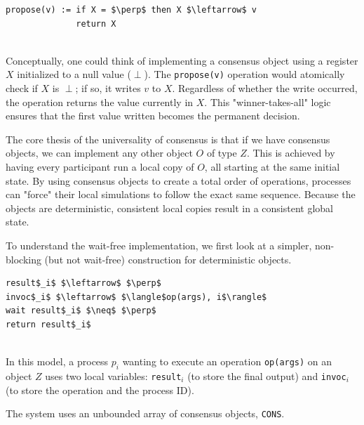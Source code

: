 \begin{minipage}{\textwidth}
\begin{lstlisting}[mathescape]
propose(v) := if X = $\perp$ then X $\leftarrow$ v
              return X
\end{lstlisting}
\end{minipage}\\
    
Conceptually, one could think of implementing a consensus object using a register $X$ initialized to a null value ($\perp$). The \texttt{propose(v)} operation would atomically check if $X$ is $\perp$; if so, it writes $v$ to $X$. Regardless of whether the write occurred, the operation returns the value currently in $X$. This "winner-takes-all" logic ensures that the first value written becomes the permanent decision.

The core thesis of the universality of consensus is that if we have consensus objects, we can implement any other object $O$ of type $Z$. This is achieved by having every participant run a local copy of $O$, all starting at the same initial state. By using consensus objects to create a total order of operations, processes can "force" their local simulations to follow the exact same sequence. Because the objects are deterministic, consistent local copies result in a consistent global state.

To understand the wait-free implementation, we first look at a simpler, non-blocking (but not wait-free) construction for deterministic objects.

\begin{minipage}{\textwidth}
\begin{lstlisting}[mathescape]
result$_i$ $\leftarrow$ $\perp$
invoc$_i$ $\leftarrow$ $\langle$op(args), i$\rangle$
wait result$_i$ $\neq$ $\perp$
return result$_i$
\end{lstlisting}
\end{minipage}\\

In this model, a process $p_i$ wanting to execute an operation \texttt{op(args)} on an object $Z$ uses two local variables: \texttt{result}$_i$ (to store the final output) and \texttt{invoc}$_i$ (to store the operation and the process ID).

The system uses an unbounded array of consensus objects, \texttt{CONS}. 

